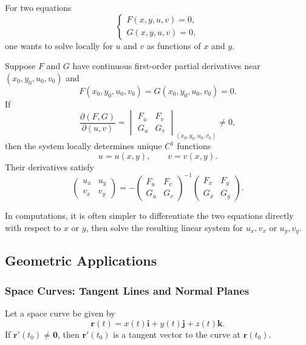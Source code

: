 For two equations
\[
\begin{cases}
    F(x,y,u,v)=0,\\
    G(x,y,u,v)=0,
\end{cases}
\]
one wants to solve locally for $u$ and $v$ as functions of $x$ and $y$.

\newpage

\begin{theorem}
Suppose $F$ and $G$ have continuous first-order partial derivatives near $(x_0,y_0,u_0,v_0)$ and
\[
    F(x_0,y_0,u_0,v_0)=G(x_0,y_0,u_0,v_0)=0.
\]
If
\[
    \frac{\partial(F,G)}{\partial(u,v)}
    =\begin{vmatrix}F_u&F_v\\G_u&G_v\end{vmatrix}_{(x_0,y_0,u_0,v_0)}\ne0,
\]
then the system locally determines unique $C^1$ functions
\[
    u=u(x,y),\qquad v=v(x,y).
\]
Their derivatives satisfy
\[
    \begin{pmatrix}
    u_x&u_y\\
    v_x&v_y
    \end{pmatrix}
    =-
    \begin{pmatrix}
    F_u&F_v\\
    G_u&G_v
    \end{pmatrix}^{-1}
    \begin{pmatrix}
    F_x&F_y\\
    G_x&G_y
    \end{pmatrix}.
\]
\end{theorem}

\begin{note}
In computations, it is often simpler to differentiate the two equations directly with respect to $x$ or $y$, then solve the resulting linear system for $u_x,v_x$ or $u_y,v_y$.
\end{note}

\subsection{Geometric Applications}

\subsubsection{Space Curves: Tangent Lines and Normal Planes}

Let a space curve be given by
\[
    \mathbf{r}(t)=x(t)\mathbf{i}+y(t)\mathbf{j}+z(t)\mathbf{k}.
\]
If $\mathbf{r}'(t_0)\ne\mathbf{0}$, then $\mathbf{r}'(t_0)$ is a tangent vector to the curve at $\mathbf{r}(t_0)$.

